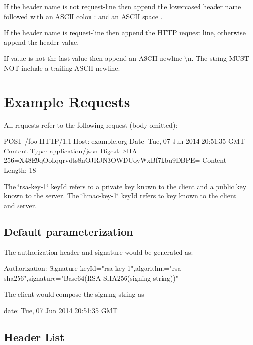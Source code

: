 \begin{DoxyEnumerate}
\item If the header name is not {\ttfamily request-\/line} then append the lowercased header name followed with an A\+S\+C\+II colon {\ttfamily \+:} and an A\+S\+C\+II space .
\item If the header name is {\ttfamily request-\/line} then append the H\+T\+TP request line, otherwise append the header value.
\item If value is not the last value then append an A\+S\+C\+II newline {\ttfamily \textbackslash{}n}. The string M\+U\+ST N\+OT include a trailing A\+S\+C\+II newline.
\end{DoxyEnumerate}

\section*{Example Requests}

All requests refer to the following request (body omitted)\+: \begin{DoxyVerb}POST /foo HTTP/1.1
Host: example.org
Date: Tue, 07 Jun 2014 20:51:35 GMT
Content-Type: application/json
Digest: SHA-256=X48E9qOokqqrvdts8nOJRJN3OWDUoyWxBf7kbu9DBPE=
Content-Length: 18
\end{DoxyVerb}


The \char`\"{}rsa-\/key-\/1\char`\"{} key\+Id refers to a private key known to the client and a public key known to the server. The \char`\"{}hmac-\/key-\/1\char`\"{} key\+Id refers to key known to the client and server.

\subsection*{Default parameterization}

The authorization header and signature would be generated as\+: \begin{DoxyVerb}Authorization: Signature keyId="rsa-key-1",algorithm="rsa-sha256",signature="Base64(RSA-SHA256(signing string))"
\end{DoxyVerb}


The client would compose the signing string as\+: \begin{DoxyVerb}date: Tue, 07 Jun 2014 20:51:35 GMT
\end{DoxyVerb}


\subsection*{Header List}

